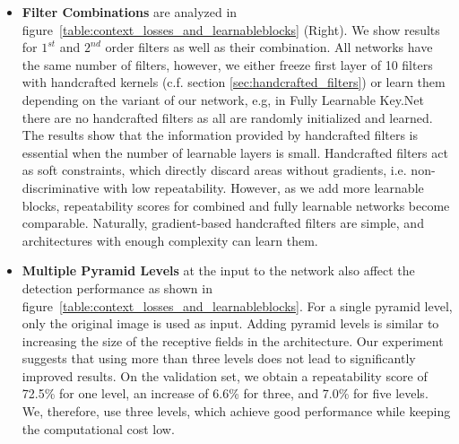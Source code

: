 \begin{itemize}
    \item \textbf{Filter Combinations} are analyzed in figure~\ref{table:context_losses_and_learnableblocks} (Right).
    We show results for $1^{st}$ and $2^{nd}$ order filters as well as their combination. All networks have the same number of filters, however, we either freeze first layer of 10 filters with handcrafted kernels (c.f. section \ref{sec:handcrafted_filters}) or learn them depending on the variant of our network, e.g, in Fully Learnable Key.Net there are no handcrafted filters as all are randomly initialized and learned. The results show that the information provided by handcrafted filters is essential when the number of learnable layers is small. Handcrafted filters act as soft constraints, which directly discard areas without gradients, i.e. non-discriminative with low repeatability. However, as we add more learnable blocks, repeatability scores for combined and fully learnable networks become comparable. Naturally, gradient-based handcrafted filters are simple, and architectures with enough complexity can learn them. %
    \item \textbf{Multiple Pyramid Levels} at the input to the network also affect the detection performance as shown in figure~\ref{table:context_losses_and_learnableblocks}. For a single pyramid level, only the original image is used as input. Adding pyramid levels is similar to increasing the size of the receptive fields in the architecture. Our experiment suggests that using more than three levels does not lead to significantly improved results. On the validation set, we obtain a repeatability score of 72.5\% for one level,  an increase of 6.6\% for three, and 7.0\% for five levels. We, therefore, use three levels, which achieve good performance while keeping the computational cost low.
\end{itemize}


